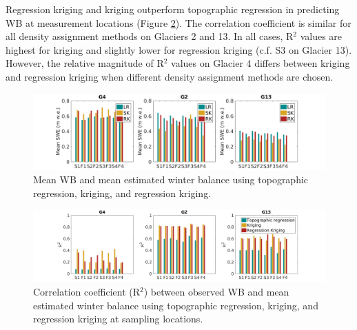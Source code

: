 \documentclass{sfuthesis}
\begin{document}
Regression kriging and kriging outperform topographic regression in predicting WB at measurement locations (Figure \ref{fig:InterpMethod_alloptsR2}). The correlation coefficient is similar for all density assignment methods on Glaciers 2 and 13. In all cases, R$^2$ values are highest for kriging and slightly lower for regression kriging (c.f. S3 on Glacier 13). However, the relative magnitude of R$^2$ values on Glacier 4 differs between kriging and regression kriging when different density assignment methods are chosen.  

\begin{landscape}
\begin{figure}
	\includegraphics[height=0.38\textwidth]{InterpMethod_allopts.png}%
	\caption{Mean WB and mean estimated winter balance using topographic regression, kriging, and regression kriging.}
	\label{fig:InterpMethod_allopts}
\end{figure}

\begin{figure}
	\includegraphics[height=0.38\textwidth]{InterpMethod_alloptsR2.png}%
	\caption{Correlation coefficient (R$^2$) between observed WB and mean estimated winter balance using topographic regression, kriging, and regression kriging at sampling locations.}
	\label{fig:InterpMethod_alloptsR2}
\end{figure}
\end{landscape}
\end{document}
